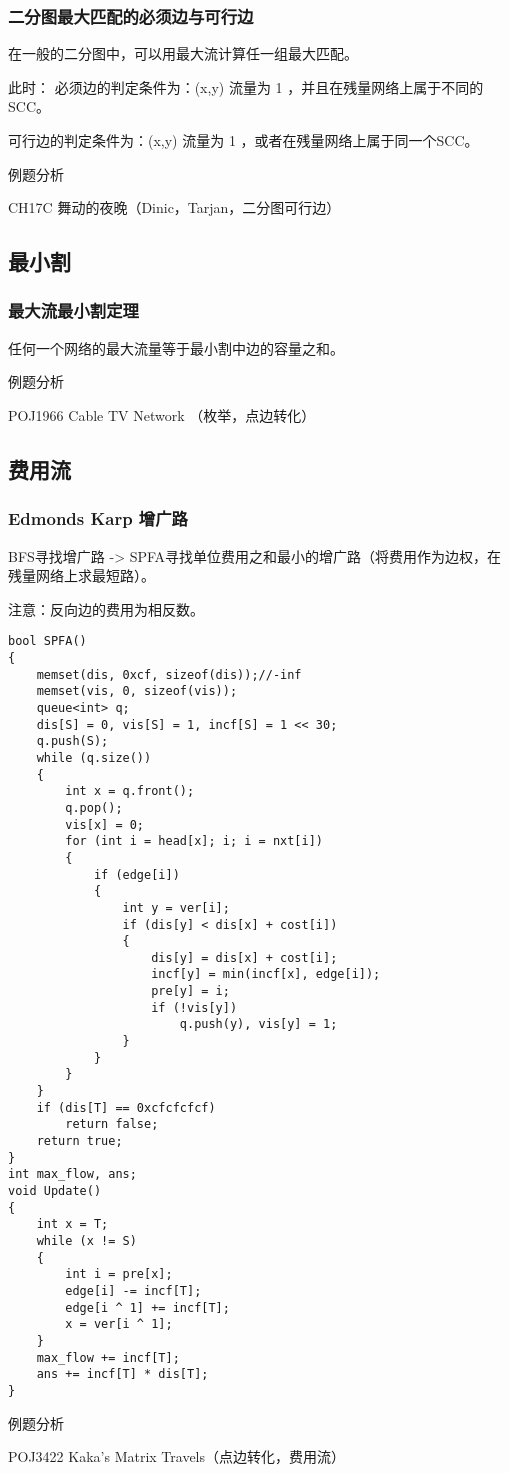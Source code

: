 \subsubsection{二分图最大匹配的必须边与可行边}
在一般的二分图中，可以用最大流计算任一组最大匹配。

此时：
    必须边的判定条件为：(x,y) 流量为 1 ，并且在残量网络上属于不同的SCC。

    可行边的判定条件为：(x,y) 流量为 1 ，或者在残量网络上属于同一个SCC。

例题分析

CH17C 舞动的夜晚（Dinic，Tarjan，二分图可行边）

\subsection{最小割}
\subsubsection{最大流最小割定理}
任何一个网络的最大流量等于最小割中边的容量之和。

例题分析

POJ1966 Cable TV Network （枚举，点边转化）

\subsection{费用流}
\subsubsection{Edmonds Karp 增广路}
BFS寻找增广路 -> SPFA寻找单位费用之和最小的增广路（将费用作为边权，在残量网络上求最短路）。

注意：反向边的费用为相反数。
\begin{lstlisting}
bool SPFA()
{
    memset(dis, 0xcf, sizeof(dis));//-inf
    memset(vis, 0, sizeof(vis));
    queue<int> q;
    dis[S] = 0, vis[S] = 1, incf[S] = 1 << 30;
    q.push(S);
    while (q.size())
    {
        int x = q.front();
        q.pop();
        vis[x] = 0;
        for (int i = head[x]; i; i = nxt[i])
        {
            if (edge[i])
            {
                int y = ver[i];
                if (dis[y] < dis[x] + cost[i])
                {
                    dis[y] = dis[x] + cost[i];
                    incf[y] = min(incf[x], edge[i]);
                    pre[y] = i;
                    if (!vis[y])
                        q.push(y), vis[y] = 1;
                }
            }
        }
    }
    if (dis[T] == 0xcfcfcfcf)
        return false;
    return true;
}
int max_flow, ans;
void Update()
{
    int x = T;
    while (x != S)
    {
        int i = pre[x];
        edge[i] -= incf[T];
        edge[i ^ 1] += incf[T];
        x = ver[i ^ 1];
    }
    max_flow += incf[T];
    ans += incf[T] * dis[T];
}
\end{lstlisting}
例题分析

POJ3422 Kaka's Matrix Travels（点边转化，费用流）
